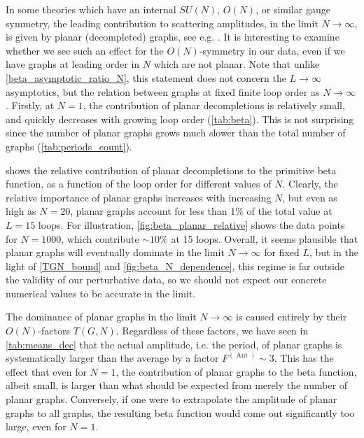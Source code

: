 \documentclass[12pt,a4paper]{article}
\newcommand{\Aut}{\operatorname{Aut}}
\renewcommand{\|}{\rule[-0.4ex]{0.2ex}{1.2em}}
\begin{document}
In some theories which have an internal $SU(N)$, $O(N)$, or similar gauge symmetry,  the leading contribution to   scattering amplitudes,  in the limit $N\rightarrow\infty$, is given by  planar (decompleted) graphs, see e.g. \cite{hooft_planar_1974,gurau_colored_2012}. It is interesting to examine whether we see such an effect for the $O(N)$-symmetry in our data, even if we have graphs at leading order in $N$ which are not planar. Note that unlike \cref{beta_asymptotic_ratio_N}, this statement does not concern the $L\rightarrow\infty$ asymptotics, but the relation between graphs at fixed finite loop order as $N\rightarrow \infty$.
Firstly, at $N=1$, the contribution of planar decompletions is relatively small, and quickly decreases with growing loop order (\cref{tab:beta}).  This is not surprising since the number of planar graphs grows much slower than the total number of graphs (\cref{tab:periods_count}). 

 shows the relative contribution of planar decompletions to the primitive beta function, as a function of the loop order for different values of $N$. Clearly, the relative importance of planar graphs increases with increasing $N$, but even as high as $N=20$, planar graphs account for less than 1\% of the total value at $L=15$ loops.   For illustration, \cref{fig:beta_planar_relative} shows the data points for $N=1000$, which contribute $\sim 10\%$ at 15 loops.   Overall, it seems plausible that planar graphs will eventually dominate in the limit $N\rightarrow \infty$ for fixed $L$, but in the light of \cref{TGN_bound} and \cref{fig:beta_N_dependence}, this regime is far outside the validity of our perturbative data, so we should not expect our concrete numerical values to be accurate in the limit.







The dominance of planar graphs in the limit $N\rightarrow\infty$ is caused entirely by their $O(N)$-factors $T(G,N)$. Regardless of these factors, we have seen in \cref{tab:means_dec} that the actual amplitude, i.e. the period, of planar graphs is systematically larger than the average by a factor $F^{(\Aut)}\sim 3$. This has the effect that even for $N=1$, the contribution of planar graphs to the beta function, albeit small, is larger than what should be expected from merely the number of planar graphs. Conversely, if one were to extrapolate the amplitude of planar graphs to all graphs, the resulting beta function would come out significantly too large, even for $N=1$.
\end{document}
